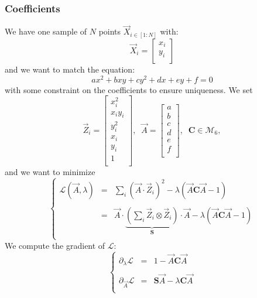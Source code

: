 \documentclass[aps,12pt]{revtex4}
\begin{document}
\subsubsection{Coefficients}
We have one sample of $N$ points $\vec{X}_{i\in[1:N]}$ with:
\begin{equation}
	\vec{X}_i = \begin{bmatrix}x_i\\y_i\\\end{bmatrix}
\end{equation}
and we want to match the equation:
\begin{equation}
	ax^2+bxy+cy^2+dx+ey+f=0
\end{equation}
with some constraint on the coefficients to ensure uniqueness.
We set
\begin{equation}
	\vec{Z}_i = \begin{bmatrix}
	x_i^2\\
	x_iy_i\\
	y_i^2\\
	x_i\\
	y_i\\
	1\\
	\end{bmatrix}
	, \;\;
	\vec{A} =
	\begin{bmatrix}
	a\\
	b\\
	c\\
	d\\
	e\\
	f\\
	\end{bmatrix},\;\;
	\bm{C} \in \mathcal{M}_6,
\end{equation}
and we want to minimize
\begin{equation}
\left\lbrace
\begin{array}{rcl}
	\mathcal{L}(\vec{A},\lambda) & = & \sum_i (\vec{A}\cdot\vec{Z}_i)^2 - \lambda \left(\vec{A} \bm{C} \vec{A}-1\right)\\
	\\
	 & = & \displaystyle \vec{A} \cdot \underbrace{\left( \sum_i \vec{Z}_i \otimes \vec{Z}_i \right)}_{\bm{S}} \cdot \vec{A} - \lambda \left(\vec{A} \bm{C} \vec{A}-1\right)\\
\end{array}
\right.
\end{equation}
We compute the gradient of $\mathcal{L}$:
\begin{equation}
\left\lbrace
\begin{array}{rcl}
\partial_\lambda \mathcal{L} & = & 1 - \vec{A} \bm{C} \vec{A}\\
\\
\partial_{\vec{A}} \mathcal{L} & = & \bm{S} \vec{A} - \lambda \bm{C}\vec{A}\\
\end{array}
\right.
\end{equation}
\end{document}
